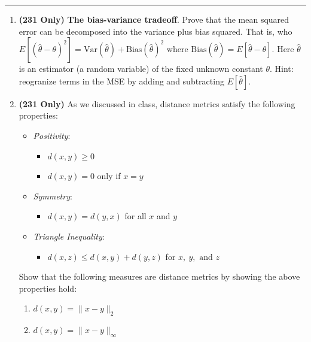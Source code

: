 \documentclass[]{article}
\providecommand{\tightlist}{%
  \setlength{\itemsep}{0pt}\setlength{\parskip}{0pt}}
\begin{document}
\begin{center}\rule{0.5\linewidth}{\linethickness}\end{center}

\begin{enumerate}
\def\labelenumi{\arabic{enumi}.}
\setcounter{enumi}{6}
\item
  \textbf{(231 Only)} \textbf{The bias-variance tradeoff}. Prove that
  the mean squared error can be decomposed into the variance plus bias
  squared. That is, who
  \(E[(\hat \theta - \theta)^2] = \text{Var}(\hat \theta) + \text{Bias}(\hat \theta )^2\)
  where \(\text{Bias}(\hat \theta) = E[\hat \theta - \theta]\). Here
  \(\hat \theta\) is an estimator (a random variable) of the fixed
  unknown constant \(\theta\). Hint: reogranize terms in the MSE by
  adding and subtracting \(E[\hat \theta]\).
\item
  \textbf{(231 Only)} As we discussed in class, distance metrics satisfy
  the following properties:

  \begin{itemize}
  \item
    \emph{Positivity}:

    \begin{itemize}
    \tightlist
    \item
      \(d(x,y)\geq 0\)
    \item
      \(d(x,y) = 0\) only if \(x=y\)
    \end{itemize}
  \item
    \emph{Symmetry}:

    \begin{itemize}
    \tightlist
    \item
      \(d(x,y) = d(y,x)\) for all \(x\) and \(y\)
    \end{itemize}
  \item
    \emph{Triangle Inequality}:

    \begin{itemize}
    \tightlist
    \item
      \(d(x,z) \leq d(x,y) + d(y,z)\) for \(x,\ y,\text{ and } z\)
    \end{itemize}
  \end{itemize}

  Show that the following measures are distance metrics by showing the
  above properties hold:

  \begin{enumerate}
  \item
    \(d(x,y) = \|x-y\|_2\)
  \item
    \(d(x,y) = \|x-y\|_\infty\)
  \end{enumerate}
\end{enumerate}
\end{document}
